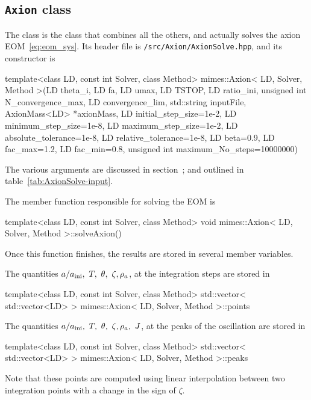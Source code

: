 \documentclass[11pt,a4paper]{article}
\begin{document}
\subsection{{\tt Axion} class}
%
The  class is the class that combines all the others, and actually solves the axion EOM~\ref{eq:eom_sys}. Its header file is {\tt \mimes/src/Axion/AxionSolve.hpp}, and its constructor is
%
\begin{cpp}
 	template<class LD, const int Solver, class Method>
	mimes::Axion< LD, Solver, Method >(LD theta_i, LD fa, LD umax, LD TSTOP, 
	LD ratio_ini, unsigned int N_convergence_max, LD convergence_lim, 
	std::string inputFile, AxionMass<LD> *axionMass, LD initial_step_size=1e-2, 
	LD minimum_step_size=1e-8, LD maximum_step_size=1e-2, LD absolute_tolerance=1e-8, 
	LD relative_tolerance=1e-8, LD beta=0.9, LD fac_max=1.2, LD fac_min=0.8, 
	unsigned int maximum_No_steps=10000000)
\end{cpp}
%
The various arguments are discussed in section~; and outlined in table~\ref{tab:AxionSolve-input}.
%

The member function responsible for solving the EOM is
%
\begin{cpp}
	template<class LD, const int Solver, class Method>
	void mimes::Axion< LD, Solver, Method >::solveAxion()
\end{cpp}
%
Once this function finishes, the results are stored in several member variables.

The quantities $a/\ai, \ T, \ \theta, \ \zeta, \rho_a$, at the integration  steps are stored in
%
\begin{cpp}
	template<class LD, const int Solver, class Method> 
	std::vector< std::vector<LD> > mimes::Axion< LD, Solver, Method >::points
\end{cpp}
%

The quantities $a/\ai, \ T, \ \theta, \ \zeta, \rho_a, \ J$, at the peaks of the oscillation are stored in 
%
\begin{cpp}
	template<class LD, const int Solver, class Method> 
	std::vector< std::vector<LD> > mimes::Axion< LD, Solver, Method >::peaks
\end{cpp}
%
Note that these points are computed using linear interpolation between two integration points with a change in the sign of $\zeta$.
\end{document}
